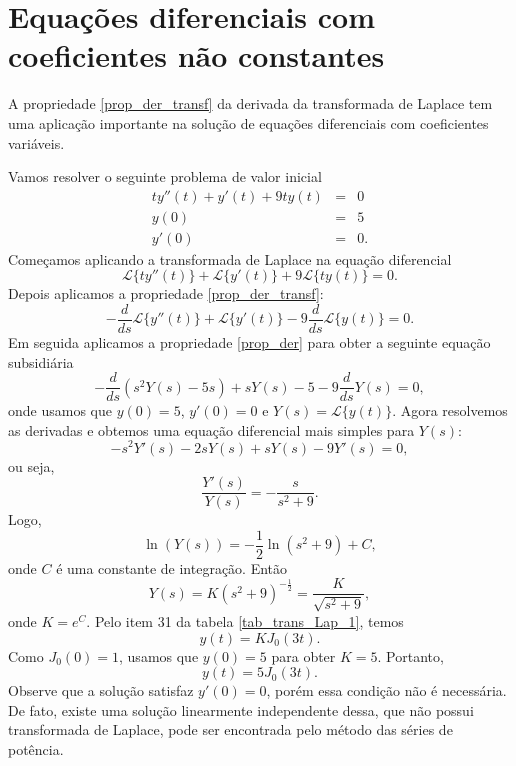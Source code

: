\section{Equações diferenciais com coeficientes não constantes}
A propriedade \ref{prop_der_transf} da derivada da transformada de Laplace tem uma aplicação importante na solução de equações diferenciais com coeficientes variáveis.
\begin{ex}Vamos resolver o seguinte problema de valor inicial
\begin{eqnarray*}
ty''(t)+y'(t)+9ty(t)&=&0\\
y(0)&=&5\\
y'(0)&=&0.
\end{eqnarray*}
Começamos aplicando a transformada de Laplace na equação diferencial
\begin{equation}
\mathcal{L}\{ty''(t)\}+\mathcal{L}\{y'(t)\}+9\mathcal{L}\{ty(t)\}=0.
\end{equation}
Depois aplicamos a propriedade \ref{prop_der_transf}:
\begin{equation}
-\frac{d}{ds}\mathcal{L}\{y''(t)\}+\mathcal{L}\{y'(t)\}-9\frac{d}{ds}\mathcal{L}\{y(t)\}=0.
\end{equation}
Em seguida aplicamos a propriedade \ref{prop_der} para obter a seguinte equação subsidiária
\begin{equation}
-\frac{d}{ds}\left(s^2Y(s)-5s\right)+sY(s)-5-9\frac{d}{ds}Y(s)=0,
\end{equation}
onde usamos que $y(0)=5$, $y'(0)=0$ e $Y(s)=\mathcal{L}\{y(t)\}$. Agora resolvemos as derivadas e obtemos uma equação diferencial mais simples para $Y(s)$:
\begin{equation}
-s^2Y'(s)-2sY(s)+sY(s)-9Y'(s)=0,
\end{equation}
ou seja,
\begin{equation}
\frac{Y'(s)}{Y(s)}=-\frac{s}{s^2+9}.
\end{equation}
Logo,
\begin{equation}
\ln(Y(s))=-\frac{1}{2}\ln(s^2+9)+C,
\end{equation}
onde $C$ é uma constante de integração. Então
\begin{equation}
Y(s)=K(s^2+9)^{-\frac{1}{2}}=\frac{K}{\sqrt{s^2+9}},
\end{equation}
onde $K=e^{C}$. Pelo item 31 da tabela \ref{tab_trans_Lap_1}, temos
\begin{equation}
y(t)=KJ_0(3t).
\end{equation}
Como $J_0(0)=1$, usamos que $y(0)=5$ para obter $K=5$. Portanto,
\begin{equation}
y(t)=5J_0(3t).
\end{equation}
Observe que a solução satisfaz $y'(0)=0$, porém essa condição não é necessária. De fato, existe uma solução linearmente independente dessa, que não possui transformada de Laplace, pode ser encontrada pelo método das séries de potência.
\end{ex}
